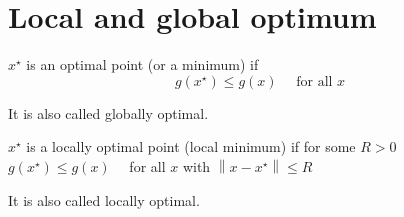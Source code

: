 \section{Local and global optimum}

\begin{definition}
    $ x^{\star} $ is an optimal point (or a minimum) if
\begin{equation}
g\left(x^{\star}\right) \leq g(x) \quad \text { for all } x
\end{equation}

It is also called globally optimal.
\end{definition}

\begin{definition}
    $ x^{\star} $ is a locally optimal point (local minimum) if for some $ R>0 $
$ g\left(x^{\star}\right) \leq g(x) \quad $ for all $ x $ with $ \left\|x-x^{\star}\right\| \leq R $

    It is also called locally optimal.
\end{definition}





